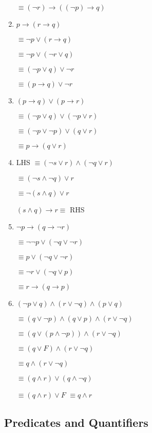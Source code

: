 \documentclass{sig-alternate-05-2015}
\begin{document}
\begin{enumerate}
$\equiv  (\neg r)\rightarrow ((\neg p)\rightarrow q)$

\item $p \rightarrow (r \rightarrow q)$

$\equiv \neg p \vee  (r \rightarrow q)$

$\equiv \neg p \vee  (\neg r \vee q)$

$\equiv (\neg p \vee   q) \vee \neg r$

$\equiv ( p \rightarrow q) \vee \neg r$

\item  $(p \rightarrow q) \vee (p \rightarrow r)$

$\equiv (\neg p \vee q) \vee (\neg p \vee r)$

$\equiv (\neg p \vee \neg p) \vee ( q \vee r)$

$\equiv  p \rightarrow ( q \vee r)$

\item LHS $\equiv (\neg s \vee r) \wedge (\neg q \vee r)$

$\equiv(\neg s \wedge \neg q) \vee r $

$\equiv\neg ( s \wedge q) \vee r $

$(s \wedge q)\rightarrow r \equiv$ RHS 

\item  $\neg p \rightarrow (q \rightarrow \neg r)$

$\equiv \neg \neg p \vee (\neg q \vee \neg r)$

$\equiv  p \vee (\neg q \vee \neg r)$

$\equiv  \neg r \vee (\neg q \vee p)$

$\equiv r \rightarrow (q \rightarrow p)$

\item $(\neg p \vee q) \wedge (r \vee \neg q) \wedge (p \vee q)$

$ \equiv (q \vee \neg p)\wedge (q \vee p) \wedge (r \vee \neg q) $

$\equiv(q\vee (p \wedge \neg p)) \wedge (r \vee \neg q)$

$\equiv(q\vee F)\wedge (r \vee \neg q)$

$\equiv q \wedge (r \vee \neg q)$

$\equiv (q \wedge r )\vee( q \wedge \neg q)$

$\equiv (q\wedge r)\vee F$
$\equiv q\wedge r$
\end{enumerate}

\subsection{Predicates and Quantifiers}
\end{document}
